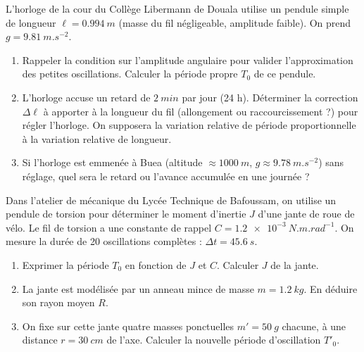 \documentclass[11pt]{article}
\begin{document}
\begin{exercice}
L'horloge de la cour du Collège Libermann de Douala utilise un pendule simple de longueur $\ell = \SI{0.994}{m}$ (masse du fil négligeable, amplitude faible). On prend $g = \SI{9.81}{m.s^{-2}}$.
\begin{enumerate}
    \item Rappeler la condition sur l'amplitude angulaire pour valider l'approximation des petites oscillations. Calculer la période propre $T_0$ de ce pendule.
    \item L'horloge accuse un retard de $\SI{2}{min}$ par jour (24 h). Déterminer la correction $\Delta \ell$ à apporter à la longueur du fil (allongement ou raccourcissement ?) pour régler l'horloge. On supposera la variation relative de période proportionnelle à la variation relative de longueur.
    \item Si l'horloge est emmenée à Buea (altitude $\approx \SI{1000}{m}$, $g \approx \SI{9.78}{m.s^{-2}}$) sans réglage, quel sera le retard ou l'avance accumulée en une journée ?
\end{enumerate}
\end{exercice}

\begin{exercice}
Dans l'atelier de mécanique du Lycée Technique de Bafoussam, on utilise un pendule de torsion pour déterminer le moment d'inertie $J$ d'une jante de roue de vélo. Le fil de torsion a une constante de rappel $C = \SI{1.2e-3}{N.m.rad^{-1}}$. On mesure la durée de 20 oscillations complètes : $\Delta t = \SI{45.6}{s}$.
\begin{enumerate}
    \item Exprimer la période $T_0$ en fonction de $J$ et $C$. Calculer $J$ de la jante.
    \item La jante est modélisée par un anneau mince de masse $m = \SI{1.2}{kg}$. En déduire son rayon moyen $R$.
    \item On fixe sur cette jante quatre masses ponctuelles $m' = \SI{50}{g}$ chacune, à une distance $r = \SI{30}{cm}$ de l'axe. Calculer la nouvelle période d'oscillation $T'_0$.
\end{enumerate}
\end{exercice}
\end{document}
